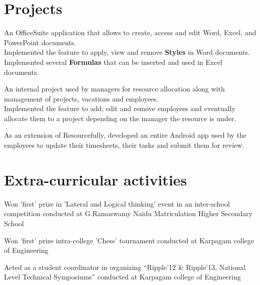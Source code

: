 \documentclass[a4paper]{srika-resume} %
\begin{document}
\begin{minipage}[t]{0.64\textwidth}
\sectionspace %


\section{Projects}


An OfficeSuite application that allows to create, access and edit Word, Excel, and PowerPoint documents.\\
Implemented the feature to apply, view and remove \textbf{Styles} in Word documents. \\
Implemented several \textbf{Formulas} that can be inserted and used in Excel documents.

\sectionspace %



An internal project used by managers for resource allocation along with management of projects, vacations and employees.  \\
Implemented the feature to add, edit and remove employees and eventually allocate them to a project depending on the manager the resource is under.

\sectionspace %



As an extension of Resourcefully, developed an entire Android app used by the employees to update their timesheets, their tasks and submit them for review. 

\sectionspace %


\section{Extra-curricular activities} 
\begin{tightitemizespaced}
\item Won 'first' prize in 'Lateral and Logical thinking' event in an inter-school competition conducted at G.Ramaswamy Naidu Matriculation Higher Secondary School
\item Won 'first' prize intra-college 'Chess' tournament conducted at Karpagam college of Engineering
\item Acted as a student coordinator in organizing “Ripple'12 \& Ripple'13, National Level Technical Symposiums” conducted at Karpagam college of Engineering
\end{tightitemizespaced}


\end{minipage}
\end{document}
